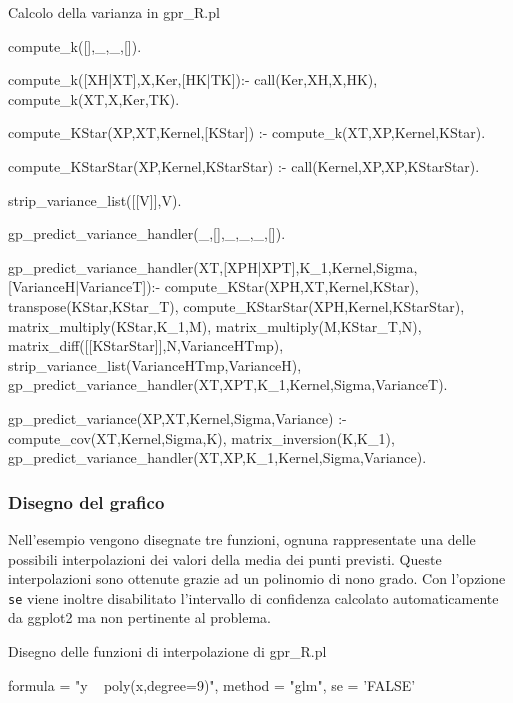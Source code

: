 \documentclass[10pt,titlepage,twoside,a4paper]{report}
\newenvironment{code}{\singlespacing\captionsetup{type=listing}}{}
\begin{document}
\begin{minipage}{\textwidth}
\centering
\begin{code}
\caption{Calcolo della varianza in gpr\_R.pl}
\label{lst:gprRVarianceComputation}
\begin{prologcode*}{}
compute_k([],_,_,[]).

compute_k([XH|XT],X,Ker,[HK|TK]):-
  call(Ker,XH,X,HK),
  compute_k(XT,X,Ker,TK).

compute_KStar(XP,XT,Kernel,[KStar]) :-
    compute_k(XT,XP,Kernel,KStar).

compute_KStarStar(XP,Kernel,KStarStar) :-
    call(Kernel,XP,XP,KStarStar).

strip_variance_list([[V]],V).

gp_predict_variance_handler(_,[],_,_,_,[]).

gp_predict_variance_handler(XT,[XPH|XPT],K_1,Kernel,Sigma,[VarianceH|VarianceT]):-
    compute_KStar(XPH,XT,Kernel,KStar),
    transpose(KStar,KStar_T),
    compute_KStarStar(XPH,Kernel,KStarStar),
    matrix_multiply(KStar,K_1,M),
    matrix_multiply(M,KStar_T,N),
    matrix_diff([[KStarStar]],N,VarianceHTmp),
    strip_variance_list(VarianceHTmp,VarianceH),
    gp_predict_variance_handler(XT,XPT,K_1,Kernel,Sigma,VarianceT).

gp_predict_variance(XP,XT,Kernel,Sigma,Variance) :-
    compute_cov(XT,Kernel,Sigma,K),
    matrix_inversion(K,K_1),
    gp_predict_variance_handler(XT,XP,K_1,Kernel,Sigma,Variance).
\end{prologcode*}
\end{code}
\end{minipage}

\subsubsection{Disegno del grafico}

Nell'esempio vengono disegnate tre funzioni, ognuna rappresentate una 
delle possibili interpolazioni dei valori della media dei punti previsti.
Queste interpolazioni sono ottenute grazie ad un polinomio di nono grado.
Con l'opzione \texttt{se} viene inoltre disabilitato l'intervallo di 
confidenza calcolato automaticamente da ggplot2 ma non pertinente al problema.

\begin{minipage}{\textwidth}
\centering
\begin{code}
\caption{Disegno delle funzioni di interpolazione di gpr\_R.pl}
\begin{rcode*}{}
formula = "y ~ poly(x,degree=9)",
method = "glm",
se = 'FALSE'
\end{rcode*}
\end{code}
\end{minipage}
\end{document}
